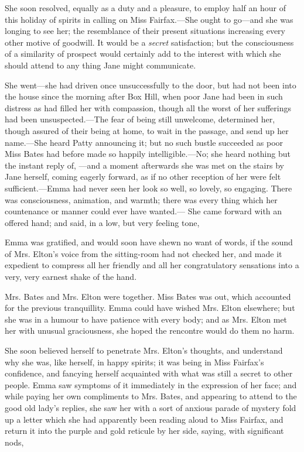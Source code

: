 She soon resolved, equally as a duty and a pleasure, to employ half an hour of this holiday of spirits in calling on Miss Fairfax.---She ought to go---and she was longing to see her; the resemblance of their present situations increasing every other motive of goodwill. It would be a {\em secret} satisfaction; but the consciousness of a similarity of prospect would certainly add to the interest with which she should attend to any thing Jane might communicate.

She went---she had driven once unsuccessfully to the door, but had not been into the house since the morning after Box Hill, when poor Jane had been in such distress as had filled her with compassion, though all the worst of her sufferings had been unsuspected.---The fear of being still unwelcome, determined her, though assured of their being at home, to wait in the passage, and send up her name.---She heard Patty announcing it; but no such bustle succeeded as poor Miss Bates had before made so happily intelligible.---No; she heard nothing but the instant reply of, ---and a moment afterwards she was met on the stairs by Jane herself, coming eagerly forward, as if no other reception of her were felt sufficient.---Emma had never seen her look so well, so lovely, so engaging. There was consciousness, animation, and warmth; there was every thing which her countenance or manner could ever have wanted.--- She came forward with an offered hand; and said, in a low, but very feeling tone,


Emma was gratified, and would soon have shewn no want of words, if the sound of Mrs. Elton's voice from the sitting-room had not checked her, and made it expedient to compress all her friendly and all her congratulatory sensations into a very, very earnest shake of the hand.

Mrs. Bates and Mrs. Elton were together. Miss Bates was out, which accounted for the previous tranquillity. Emma could have wished Mrs. Elton elsewhere; but she was in a humour to have patience with every body; and as Mrs. Elton met her with unusual graciousness, she hoped the rencontre would do them no harm.

She soon believed herself to penetrate Mrs. Elton's thoughts, and understand why she was, like herself, in happy spirits; it was being in Miss Fairfax's confidence, and fancying herself acquainted with what was still a secret to other people. Emma saw symptoms of it immediately in the expression of her face; and while paying her own compliments to Mrs. Bates, and appearing to attend to the good old lady's replies, she saw her with a sort of anxious parade of mystery fold up a letter which she had apparently been reading aloud to Miss Fairfax, and return it into the purple and gold reticule by her side, saying, with significant nods,

